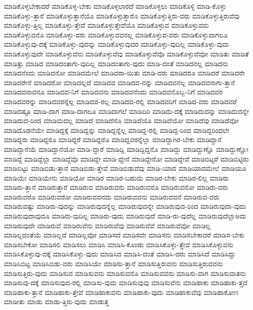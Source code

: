{ಮಾಡಿಕೊಳ್ಳಬೇಕಾದರೆ
ಮಾಡಿಕೊಳ್ಳ-ಬೇಕು
ಮಾಡಿಕೊಳ್ಳಲಾರದೆ
ಮಾಡಿಕೊಳ್ಳಲು
ಮಾಡಿಕೊಳ್ಳಿ
ಮಾಡಿ-ಕೊಳ್ಳು
ಮಾಡಿಕೊಳ್ಳು-ತ್ತಾನೆ
ಮಾಡಿಕೊಳ್ಳುತ್ತಾನೆಯೊ
ಮಾಡಿಕೊಳ್ಳುತ್ತಾರೊ
ಮಾಡಿಕೊಳ್ಳುತ್ತಿರು-ವರು
ಮಾಡಿಕೊಳ್ಳುತ್ತಿರುವೆವು
ಮಾಡಿಕೊಳ್ಳು-ತ್ತಿಲ್ಲ
ಮಾಡಿಕೊಳ್ಳು-ತ್ತೇವೆ
ಮಾಡಿಕೊಳ್ಳುತ್ತೇವೆಯೊ
ಮಾಡಿಕೊಳ್ಳುವ
ಮಾಡಿಕೊಳ್ಳುವನು
ಮಾಡಿಕೊಳ್ಳುವನೊ
ಮಾಡಿಕೊಳ್ಳು-ವರು
ಮಾಡಿಕೊಳ್ಳುವವನಲ್ಲ
ಮಾಡಿಕೊಳ್ಳುವ-ವರು
ಮಾಡಿಕೊಳ್ಳುವಾಗಲೂ
ಮಾಡಿಕೊಳ್ಳುವು-ದಕ್ಕೆ
ಮಾಡಿಕೊಳ್ಳು-ವುದನ್ನು
ಮಾಡಿಕೊಳ್ಳುವುದರ
ಮಾಡಿಕೊಳ್ಳು-ವುದಿಲ್ಲ
ಮಾಡಿಕೊಳ್ಳು-ವುದು
ಮಾಡಿಕೊಳ್ಳುವುದೇ
ಮಾಡಿಕೊಳ್ಳುವೆನು
ಮಾಡಿಕೊಳ್ಳುವೆವು
ಮಾಡಿಕೊಳ್ಳುವೆವೊ
ಮಾಡಿಕೊಳ್ಳುವೆವೋ
ಮಾಡಿತು
ಮಾಡಿತೆ
ಮಾಡಿತ್ತು
ಮಾಡಿದ
ಮಾಡಿದಂತಾಗು-ವುದಿಲ್ಲ
ಮಾಡಿದಂತಾಗು-ವುದು
ಮಾಡಿ-ದಂತೆ
ಮಾಡಿದನಲ್ಲ
ಮಾಡಿದನು
ಮಾಡಿದನೆಂದು
ಮಾಡಿದನೋ
ಮಾಡಿದಮೇಲೆ
ಮಾಡಿದರಾ-ಯಿತು
ಮಾಡಿ-ದರು
ಮಾಡಿದರೂ
ಮಾಡಿದರೆ
ಮಾಡಿದರೇ
ಮಾಡಿದರೇನೆ
ಮಾಡಿದರೋ
ಮಾಡಿದಲ್ಲದೆ
ಮಾಡಿದವ
ಮಾಡಿದವ-ನನ್ನು
ಮಾಡಿದವನಲ್ಲ
ಮಾಡಿದವನಾಗು-ತ್ತಾನೆ
ಮಾಡಿದವನಾವನೂ
ಮಾಡಿದವ-ನಿಗೆ
ಮಾಡಿದವನು
ಮಾಡಿದವನೆಂದು
ಮಾಡಿದವನೊಬ್ಬ-ನಿಗೆ
ಮಾಡಿದವರ
ಮಾಡಿದವರನ್ನು
ಮಾಡಿದವರನ್ನೆಲ್ಲ
ಮಾಡಿದವ-ರಲ್ಲ
ಮಾಡಿದವ-ರಲ್ಲಿ
ಮಾಡಿದವರಿಗೆ
ಮಾಡಿದ-ವರು
ಮಾಡಿದವರೆ
ಮಾಡಿದಷ್ಟೂ
ಮಾಡಿ-ದಾಗ
ಮಾಡಿ-ದಾಗಲೂ
ಮಾಡಿದಾಗಲೆ
ಮಾಡಿದಿರಿ
ಮಾಡಿದು-ದಕ್ಕೆ
ಮಾಡಿದುದನ್ನು
ಮಾಡಿದುದನ್ನೇ
ಮಾಡಿದುದ-ರಿಂದ
ಮಾಡಿದುದಲ್ಲ
ಮಾಡಿದೆ
ಮಾಡಿದೆನೊ
ಮಾಡಿದೆಯೊ
ಮಾಡಿದೆಯೋ
ಮಾಡಿದೆವು
ಮಾಡಿದೆವೋ
ಮಾಡಿದೊಡನೆಯೇ
ಮಾಡಿದ್ದಕ್ಕೆ
ಮಾಡಿದ್ದನ್ನು
ಮಾಡಿದ್ದನ್ನೆಲ್ಲ
ಮಾಡಿದ್ದ-ರಲ್ಲಿ
ಮಾಡಿದ್ದ-ರಿಂದ
ಮಾಡಿದ್ದರಿಂದಲೇ
ಮಾಡಿದ್ದರು
ಮಾಡಿದ್ದರೂ
ಮಾಡಿದ್ದರೆ
ಮಾಡಿದ್ದರೊ
ಮಾಡಿದ್ದವರನ್ನೆಲ್ಲಾ
ಮಾಡಿದ್ದಾಗಿರ-ಬೇಕು
ಮಾಡಿದ್ದಾನೆ
ಮಾಡಿದ್ದಾನೆಯೆ
ಮಾಡಿದ್ದಾನೆಯೋ
ಮಾಡಿ-ದ್ದಾರೆ
ಮಾಡಿದ್ದಿ
ಮಾಡಿದ್ದಿದ್ದನೊ
ಮಾಡಿದ್ದು
ಮಾಡಿದ್ದುಣ್ಣೊ
ಮಾಡಿದ್ದುಣ್ಣೋ
ಮಾಡಿದ್ದೆ
ಮಾಡಿದ್ದೆಲ್ಲಾ
ಮಾಡಿದ್ದೆವೊ
ಮಾಡಿದ್ದೇ
ಮಾಡಿ-ದ್ದೇನೆ
ಮಾಡಿದ್ದೇನೋ
ಮಾಡಿದ್ದೇವೆ
ಮಾಡಿಬಿಟ್ಟರೆ
ಮಾಡಿಬಿಟ್ಟಿರು
ಮಾಡಿಬಿಟ್ಟು
ಮಾಡಿಬಿಡು-ತ್ತಾನೆ
ಮಾಡಿಬಿಡು-ತ್ತೇವೆ
ಮಾಡಿಬಿಡುವೆವು
ಮಾಡಿ-ಯಾದ
ಮಾಡಿಯಾದಮೇಲೆ
ಮಾಡಿಯೂ
ಮಾಡಿಯೇ
ಮಾಡಿಯೇನು
ಮಾಡಿಯೋ
ಮಾಡಿರ
ಮಾಡಿರ-ಬಹುದು
ಮಾಡಿರ-ಬೇಕು
ಮಾಡಿರ-ಲಿಲ್ಲ
ಮಾಡಿರು
ಮಾಡಿರು-ತ್ತಾನೆ
ಮಾಡಿರುತ್ತಾರೆ
ಮಾಡಿರುವ
ಮಾಡಿರುವನು
ಮಾಡಿರುವನೊ
ಮಾಡಿರುವನೋ
ಮಾಡಿರು-ವರು
ಮಾಡಿರುವರೊ
ಮಾಡಿರುವರೋ
ಮಾಡಿರುವವನದು
ಮಾಡಿರುವವನು
ಮಾಡಿರುವವನೆ
ಮಾಡಿರುವ-ವರು
ಮಾಡಿರುವಷ್ಟು
ಮಾಡಿರು-ವುದನ್ನು
ಮಾಡಿರುವುದನ್ನೆಲ್ಲ
ಮಾಡಿರುವುದನ್ನೇ
ಮಾಡಿರುವುದ-ರಿಂದ
ಮಾಡಿರುವುದಾ-ವುದು
ಮಾಡಿರುವುದಾವುದೂ
ಮಾಡಿರು-ವುದಿಲ್ಲ
ಮಾಡಿರು-ವುದು
ಮಾಡಿರುವುದೆ
ಮಾಡಿ-ರು-ವುದೆಲ್ಲ
ಮಾಡಿರುವುದೆಲ್ಲಾಅದು
ಮಾಡಿರುವುದೇ
ಮಾಡಿರುವೆ
ಮಾಡಿರುವೆನು
ಮಾಡಿರುವೆವು
ಮಾಡಿರುವೆವೆ
ಮಾಡಿರುವೆವೋ
ಮಾಡಿಲ್ಲ
ಮಾಡಿಲ್ಲದಂತೆಯೆ
ಮಾಡಿಲ್ಲದೆ
ಮಾಡಿಲ್ಲವೋ
ಮಾಡಿಸದೆ
ಮಾಡಿಸದೇ
ಮಾಡಿಸನು
ಮಾಡಿಸಬೇಕಾದರೆ
ಮಾಡಿಸ-ಬೇಕು
ಮಾಡಿಸಬೇಕೋ
ಮಾಡಿಸಲಿ
ಮಾಡಿಸಲು
ಮಾಡಿಸಿ
ಮಾಡಿಸಿ-ಕೊಂಡು
ಮಾಡಿಸಿಕೊಳ್ಳು-ತ್ತೇವೆ
ಮಾಡಿಸಿಕೊಳ್ಳುವನು
ಮಾಡಿಸಿಕೊಳ್ಳುವು-ದಕ್ಕೆ
ಮಾಡಿಸಿಕೊಳ್ಳು-ವುದು
ಮಾಡಿಸಿದ
ಮಾಡಿಸಿ-ದಂತೆ
ಮಾಡಿಸಿ-ದರು
ಮಾಡಿಸಿದೆ
ಮಾಡಿಸಿದ್ದು
ಮಾಡಿಸಿಬಿಟ್ಟ
ಮಾಡಿಸಿಬಿಡು-ವರು
ಮಾಡಿಸಿಯೇ
ಮಾಡಿಸು-ತ್ತಾನೆ
ಮಾಡಿಸುತ್ತಿರುವನು
ಮಾಡಿಸುತ್ತಿರುವವನು
ಮಾಡಿಸುತ್ತಿರು-ವುದು
ಮಾಡಿಸುವ
ಮಾಡಿಸುವನು
ಮಾಡಿಸುವನೊ
ಮಾಡಿಸುವವನು
ಮಾಡಿಸು-ವಾಗ
ಮಾಡಿಸುವಾತನು
ಮಾಡಿಸುವು-ದಕ್ಕೆ
ಮಾಡಿಸುವುದ-ರಲ್ಲಿ
ಮಾಡಿಸು-ವುದು
ಮಾಡಿಸುವುವು
ಮಾಡಿಸುವೆನು
ಮಾಡಿಹಾಕು
ಮಾಡಿಹಾಕು-ತ್ತದೆ
ಮಾಡಿಹಾಕು-ತ್ತಾನೆ
ಮಾಡಿಹಾಕು-ತ್ತೇವೆ
ಮಾಡಿಹಾಕುವನು
ಮಾಡಿಹಾಕು-ವುದು
ಮಾಡಿಹಾಕುವೆವು
ಮಾಡಿಹಾಕೋಣ
ಮಾಡೀತು
ಮಾಡು
ಮಾಡು-ತ್ತಿರು-ವುದು
ಮಾಡುತ್ತ
}
